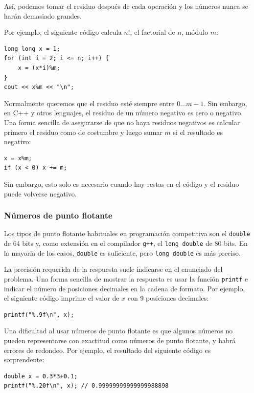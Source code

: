 Así, podemos tomar el residuo después de cada operación
y los números nunca se harán demasiado grandes.

Por ejemplo, el siguiente código calcula $n!$,
el factorial de $n$, módulo $m$:
\begin{lstlisting}
long long x = 1;
for (int i = 2; i <= n; i++) {
    x = (x*i)%m;
}
cout << x%m << "\n";
\end{lstlisting}

Normalmente queremos que el residuo esté siempre
entre $0\ldots m-1$.
Sin embargo, en C++ y otros lenguajes,
el residuo de un número negativo
es cero o negativo.
Una forma sencilla de asegurarse de que no haya
residuos negativos es calcular primero
el residuo como de costumbre y luego sumar $m$
si el resultado es negativo:
\begin{lstlisting}
x = x%m;
if (x < 0) x += m;
\end{lstlisting}
Sin embargo, esto solo es necesario cuando hay
restas en el código y el
residuo puede volverse negativo.

\subsubsection{Números de punto flotante}


Los tipos de punto flotante habituales en
programación competitiva son
el \texttt{double} de 64 bits
y, como extensión en el compilador \texttt{g++},
el \texttt{long double} de 80 bits.
En la mayoría de los casos, \texttt{double} es suficiente,
pero \texttt{long double} es más preciso.

La precisión requerida de la respuesta
suele indicarse en el enunciado del problema.
Una forma sencilla de mostrar la respuesta es usar
la función \texttt{printf}
e indicar el número de posiciones decimales
en la cadena de formato.
Por ejemplo, el siguiente código imprime
el valor de $x$ con 9 posiciones decimales:

\begin{lstlisting}
printf("%.9f\n", x);
\end{lstlisting}

Una dificultad al usar números de punto flotante
es que algunos números no pueden representarse
con exactitud como números de punto flotante,
y habrá errores de redondeo.
Por ejemplo, el resultado del siguiente código
es sorprendente:

\begin{lstlisting}
double x = 0.3*3+0.1;
printf("%.20f\n", x); // 0.99999999999999988898
\end{lstlisting}

